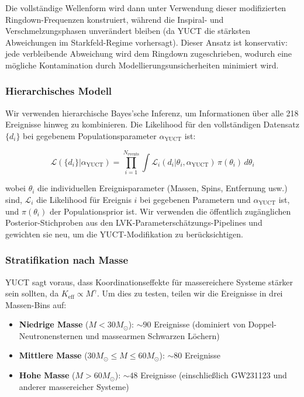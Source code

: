 \documentclass[12pt,a4paper]{article}
\theoremstyle{remark}
\newcommand{\Keff}{K_{\mathrm{eff}}}
\begin{document}
	Die vollständige Wellenform wird dann unter Verwendung dieser modifizierten Ringdown-Frequenzen konstruiert, während die Inspiral- und Verschmelzungsphasen unverändert bleiben (da YUCT die stärksten Abweichungen im Starkfeld-Regime vorhersagt). Dieser Ansatz ist konservativ: jede verbleibende Abweichung wird dem Ringdown zugeschrieben, wodurch eine mögliche Kontamination durch Modellierungsunsicherheiten minimiert wird.
	
	\subsubsection{Hierarchisches Modell}
	
	Wir verwenden hierarchische Bayes'sche Inferenz, um Informationen über alle 218 Ereignisse hinweg zu kombinieren. Die Likelihood für den vollständigen Datensatz $\{d_i\}$ bei gegebenem Populationsparameter $\alpha_{\text{YUCT}}$ ist:
	
	\begin{equation}
		\mathcal{L}(\{d_i\} | \alpha_{\text{YUCT}}) = \prod_{i=1}^{N_{\text{events}}} \int \mathcal{L}_i(d_i | \theta_i, \alpha_{\text{YUCT}}) \, \pi(\theta_i) \, d\theta_i
		\label{eq:hierarchical}
	\end{equation}
	
	wobei $\theta_i$ die individuellen Ereignisparameter (Massen, Spins, Entfernung usw.) sind, $\mathcal{L}_i$ die Likelihood für Ereignis $i$ bei gegebenen Parametern und $\alpha_{\text{YUCT}}$ ist, und $\pi(\theta_i)$ der Populationsprior ist. Wir verwenden die öffentlich zugänglichen Posterior-Stichproben aus den LVK-Parameterschätzungs-Pipelines und gewichten sie neu, um die YUCT-Modifikation zu berücksichtigen.
	
	\subsubsection{Stratifikation nach Masse}
	
	YUCT sagt voraus, dass Koordinationseffekte für massereichere Systeme stärker sein sollten, da $\Keff \propto M^{\gamma}$. Um dies zu testen, teilen wir die Ereignisse in drei Massen-Bins auf:
	
	\begin{itemize}
		\item \textbf{Niedrige Masse} ($M < 30 M_\odot$): $\sim 90$ Ereignisse (dominiert von Doppel-Neutronensternen und massearmen Schwarzen Löchern)
		\item \textbf{Mittlere Masse} ($30 M_\odot \le M \le 60 M_\odot$): $\sim 80$ Ereignisse
		\item \textbf{Hohe Masse} ($M > 60 M_\odot$): $\sim 48$ Ereignisse (einschließlich GW231123 und anderer massereicher Systeme)
	\end{itemize}
	
\end{document}
